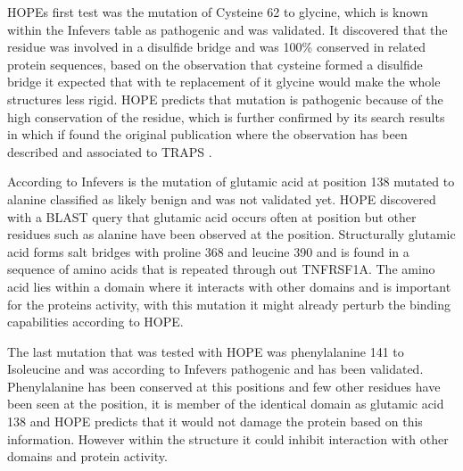 	HOPEs first test was the mutation of Cysteine 62 to glycine, which is known within the Infevers table as pathogenic and was validated. It discovered that the residue was involved in a disulfide bridge and was 100\% conserved in related protein sequences, based on the observation that cysteine formed a disulfide bridge it expected that with te replacement of it glycine would make the whole structures less rigid. HOPE predicts that mutation is pathogenic because of the high conservation of the residue, which is further confirmed by its search results in which if found the original publication where the observation has been described and associated to TRAPS \cite{aksentijevich_tumor-necrosis-factor_2001}.
	
	According to Infevers is the mutation of glutamic acid at position 138 mutated to alanine classified as likely benign and was not validated yet. HOPE discovered with a BLAST query that glutamic acid occurs often at position but other residues such as alanine have been observed at the position. Structurally glutamic acid forms salt bridges with proline  368 and leucine 390 and is found in a sequence of amino acids that is repeated through out TNFRSF1A. The amino acid lies within a domain where it interacts with other domains and is important for the proteins activity, with this mutation it might already perturb the binding capabilities according to HOPE.
	
	The last mutation that was tested with HOPE was phenylalanine 141 to Isoleucine and was according to Infevers pathogenic and has been validated. Phenylalanine has been conserved at this positions and few other residues have been seen at the position, it is member of the identical domain as glutamic acid 138 and HOPE predicts that it would not damage the protein based on this information. However within the structure it could inhibit interaction with other domains and protein activity.
	
